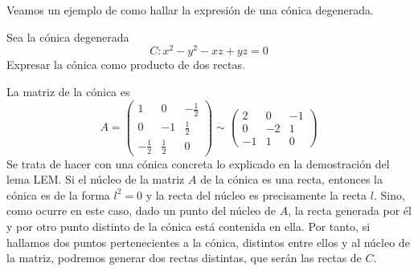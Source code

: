 Veamos un ejemplo de como hallar la expresión de una cónica degenerada.

\begin{exa}
	Sea la cónica degenerada
	\begin{equation}
	C: x^2-y^2-xz+yz=0
	\end{equation}
	Expresar la cónica como producto de dos rectas.
	
	La matriz de la cónica es
	\begin{equation}
	A=\left( \begin{array}{rrr}
	1&0&-\frac{1}{2}\\
	0&-1&\frac{1}{2}\\
	-\frac{1}{2}&\frac{1}{2}& 0
	\end{array}\right) \sim
	\left( \begin{array}{rrr}
	2&0&-1\\
	0&-2&1\\
	-1&1&0
	\end{array}\right)
	\end{equation}
	Se trata de hacer con una cónica concreta lo explicado en la demostración del lema LEM. Si el núcleo de la matriz $A$ de la cónica es una recta, entonces la cónica es de la forma $l^2=0$ y la recta del núcleo es precisamente la recta $l$. Sino, como ocurre en este caso, dado un punto del núcleo de $A$, la recta generada por él y por otro punto distinto de la cónica está contenida en ella. Por tanto, si hallamos dos puntos pertenecientes a la cónica, distintos entre ellos y al núcleo de la matriz, podremos generar dos rectas distintas, que serán las rectas de $C$.
	

\end{exa}
